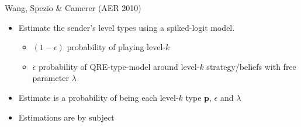 \documentclass{beamer}
\begin{document}
\begin{frame}{Wang, Spezio \& Camerer (AER 2010)}
	\begin{itemize}
		\item Estimate the sender's level types using a spiked-logit model.
		\begin{itemize}
			\item $(1-\epsilon)$ probability of playing level-$k$
			\item $\epsilon$  probability of QRE-type-model around level-$k$ strategy/beliefs with free parameter $\lambda$
		\end{itemize}
		\item Estimate is a probability of being each level-$k$ type $\mathbf{p}$, $\epsilon$ and $\lambda$
		\item Estimations are by subject
	\end{itemize}
\end{frame}
\end{document}
